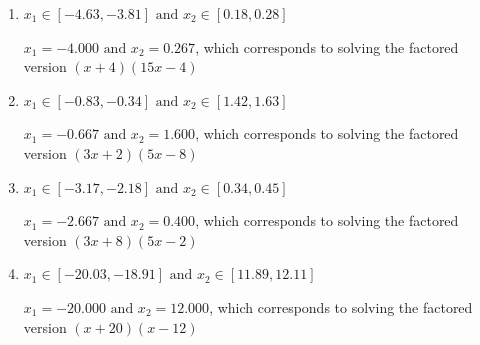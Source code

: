 \documentclass{extbook}[14pt]
\begin{document}
\begin{enumerate}
{\begin{enumerate}[label=\Alph*.]
* $x_1 = -1.333 \text{ and } x_2 = 0.800$, which is the correct option. Obtained by solving the factored version $(3x + 4)(5x -4)$
\item \( x_1 \in [-4.63, -3.81] \text{ and } x_2 \in [0.18, 0.28] \)

$x_1 = -4.000 \text{ and } x_2 = 0.267$, which corresponds to solving the factored version $(x + 4)(15x -4)$
\item \( x_1 \in [-0.83, -0.34] \text{ and } x_2 \in [1.42, 1.63] \)

$x_1 = -0.667 \text{ and } x_2 = 1.600$, which corresponds to solving the factored version $(3x + 2)(5x -8)$
\item \( x_1 \in [-3.17, -2.18] \text{ and } x_2 \in [0.34, 0.45] \)

$x_1 = -2.667 \text{ and } x_2 = 0.400$, which corresponds to solving the factored version $(3x + 8)(5x -2)$
\item \( x_1 \in [-20.03, -18.91] \text{ and } x_2 \in [11.89, 12.11] \)

$x_1 = -20.000 \text{ and } x_2 = 12.000$, which corresponds to solving the factored version $(x + 20)(x -12)$
\end{enumerate}

}
\end{enumerate}
\end{document}
